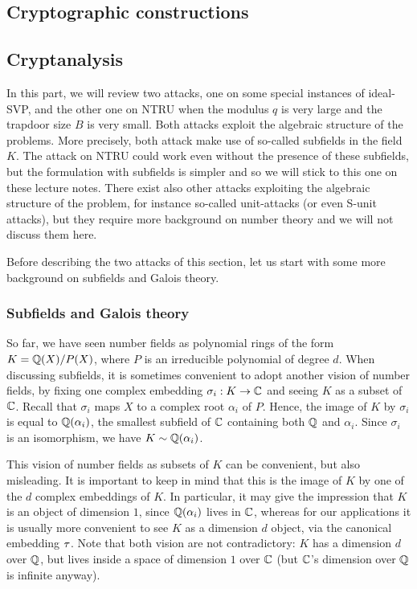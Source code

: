 \subsection{Cryptographic constructions}
\label{sec:constructions}

\subsection{Cryptanalysis}
\label{sec:cryptanalysis}

In this part, we will review two attacks, one on some special instances of ideal-SVP, and the other one on NTRU when the modulus $q$ is very large and the trapdoor size $B$ is very small. Both attacks exploit the algebraic structure of the problems. More precisely, both attack make use of so-called subfields in the field $K$. The attack on NTRU could work even without the presence of these subfields, but the formulation with subfields is simpler and so we will stick to this one on these lecture notes.
There exist also other attacks exploiting the algebraic structure of the problem, for instance so-called unit-attacks (or even S-unit attacks), but they require more background on number theory and we will not discuss them here.

Before describing the two attacks of this section, let us start with some more background on subfields and Galois theory.

\subsubsection{Subfields and Galois theory}

So far, we have seen number fields as polynomial rings of the form $K = \mathbb{Q}(X)/P(X)$, where $P$ is an irreducible polynomial of degree $d$. When discussing subfields, it is sometimes convenient to adopt another vision of number fields, by fixing one complex embedding $\sigma_i: K \rightarrow \mathbb{C}$ and seeing $K$ as a subset of $\mathbb{C}$. Recall that $\sigma_i$ maps $X$ to a complex root $\alpha_i$ of $P$. Hence, the image of $K$ by $\sigma_i$ is equal to $\mathbb{Q}(\alpha_i)$, the smallest subfield of $\mathbb{C}$ containing both $\mathbb{Q}$ and $\alpha_i$. Since $\sigma_i$ is an isomorphism, we have $K \sim \mathbb{Q}(\alpha_i)$.

This vision of number fields as subsets of $K$ can be convenient, but also misleading. It is important to keep in mind that this is the image of $K$ by one of the $d$ complex embeddings of $K$. In particular, it may give the impression that $K$ is an object of dimension $1$, since $\mathbb{Q}(\alpha_i)$ lives in $\mathbb{C}$, whereas for our applications it is usually more convenient to see $K$ as a dimension $d$ object, via the canonical embedding $\tau$. Note that both vision are not contradictory: $K$ has a dimension $d$ over $\mathbb{Q}$, but lives inside a space of dimension $1$ over $\mathbb{C}$ (but $\mathbb{C}$'s dimension over $\mathbb{Q}$ is infinite anyway).

